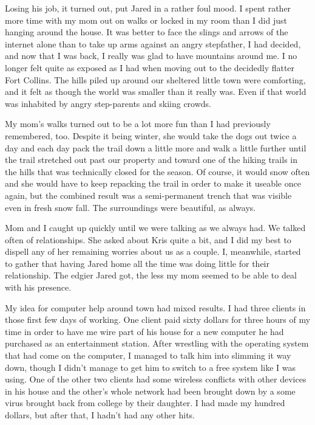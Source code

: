 Losing his job, it turned out, put Jared in a rather foul mood.  I spent rather more time with my mom out on walks or locked in my room than I did just hanging around the house.  It was better to face the slings and arrows of the internet alone than to take up arms against an angry stepfather, I had decided, and now that I was back, I really was glad to have mountains around me.  I no longer felt quite as exposed as I had when moving out to the decidedly flatter Fort Collins.  The hills piled up around our sheltered little town were comforting, and it felt as though the world was smaller than it really was.  Even if that world was inhabited by angry step-parents and skiing crowds.

My mom's walks turned out to be a lot more fun than I had previously remembered, too.  Despite it being winter, she would take the dogs out twice a day and each day pack the trail down a little more and walk a little further until the trail stretched out past our property and toward one of the hiking trails in the hills that was technically closed for the season.  Of course, it would snow often and she would have to keep repacking the trail in order to make it useable once again, but the combined result was a semi-permanent trench that was visible even in fresh snow fall.  The surroundings were beautiful, as always.

Mom and I caught up quickly until we were talking as we always had.  We talked often of relationships.  She asked about Kris quite a bit, and I did my best to dispell any of her remaining worries about us as a couple.  I, meanwhile, started to gather that having Jared home all the time was doing little for their relationship.  The edgier Jared got, the less my mom seemed to be able to deal with his presence.

My idea for computer help around town had mixed results.  I had three clients in those first few days of working.  One client paid sixty dollars for three hours of my time in order to have me wire part of his house for a new computer he had purchased as an entertainment station.  After wrestling with the operating system that had come on the computer, I managed to talk him into slimming it way down, though I didn't manage to get him to switch to a free system like I was using.  One of the other two clients had some wireless conflicts with other devices in his house and the other's whole network had been brought down by a some virus brought back from college by their daughter.  I had made my hundred dollars, but after that, I hadn't had any other hits.


